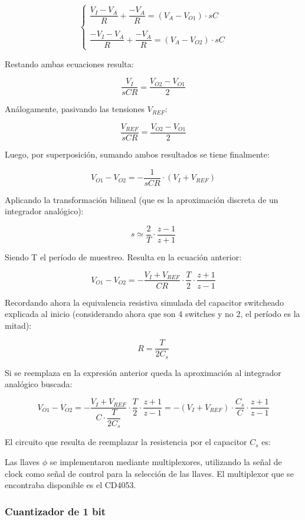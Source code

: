 \documentclass[assd_tp3_main.tex]{subfiles}
\begin{document}
\[
\left\lbrace
\begin{array}{l}
\dfrac{V_I-V_A}{R} + \dfrac{-V_A}{R} = (V_A-V_{O1}) \cdot sC \\
\\
\dfrac{-V_I-V_A}{R} + \dfrac{-V_A}{R} = (V_A-V_{O2}) \cdot sC
\end{array}
\right.
\] 

Restando ambas ecuaciones resulta:

\[
\frac{V_I}{sCR} = \frac{V_{O2}-V_{O1}}{2}
\]

Análogamente, pasivando las tensiones $V_{REF}$:

\[
\frac{V_{REF}}{sCR} = \frac{V_{O2}-V_{O1}}{2}
\]

Luego, por superposición, sumando ambos resultados se tiene finalmente:

\[
V_{O1} - V_{O2} = -\frac{1}{sCR} \cdot (V_I + V_{REF})
\]

Aplicando la transformación bilineal (que es la aproximación discreta de un integrador analógico):

\[
s \simeq \frac{2}{T} \cdot \frac{z-1}{z+1}
\]

Siendo T el período de muestreo. Resulta en la ecuación anterior:

\[
V_{O1}-V_{O2} = -\frac{V_I+V_{REF}}{CR} \cdot \frac{T}{2} \cdot \frac{z+1}{z-1}
\]

Recordando ahora la equivalencia resistiva simulada del capacitor switcheado explicada al inicio (considerando ahora que son 4 switches y no 2, el período es la mitad):

\[
R = \frac{T}{2C_s}
\]

Si se reemplaza en la expresión anterior queda la aproximación al integrador analógico buscada:

\[
V_{O1}-V_{O2} = -\frac{V_I+V_{REF}}{C \cdot \dfrac{T}{2C_s}} \cdot \frac{T}{2} \cdot \frac{z+1}{z-1} = -(V_I + V_{REF}) \cdot \frac{C_s}{C} \cdot \frac{z+1}{z-1}
\]

El circuito que resulta de reemplazar la resistencia por el capacitor $C_s$ es:


Las llaves $\phi$ se implementaron mediante multiplexores, utilizando la señal de clock como señal de control para la selección de las llaves. El multiplexor que se encontraba disponible es el CD4053.

\subsubsection{Cuantizador de 1 bit}
\end{document}
